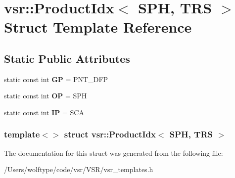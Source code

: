 \hypertarget{structvsr_1_1_product_idx_3_01_s_p_h_00_01_t_r_s_01_4}{\section{vsr\-:\-:Product\-Idx$<$ S\-P\-H, T\-R\-S $>$ Struct Template Reference}
\label{structvsr_1_1_product_idx_3_01_s_p_h_00_01_t_r_s_01_4}
}
\subsection*{Static Public Attributes}
\begin{DoxyCompactItemize}
\item 
\hypertarget{structvsr_1_1_product_idx_3_01_s_p_h_00_01_t_r_s_01_4_a03d2285a868105f6c9f671dab179a107}{static const int {\bfseries G\-P} = P\-N\-T\-\_\-\-D\-F\-P}\label{structvsr_1_1_product_idx_3_01_s_p_h_00_01_t_r_s_01_4_a03d2285a868105f6c9f671dab179a107}

\item 
\hypertarget{structvsr_1_1_product_idx_3_01_s_p_h_00_01_t_r_s_01_4_a7013ed3baad7e838ea842f1cc297808a}{static const int {\bfseries O\-P} = S\-P\-H}\label{structvsr_1_1_product_idx_3_01_s_p_h_00_01_t_r_s_01_4_a7013ed3baad7e838ea842f1cc297808a}

\item 
\hypertarget{structvsr_1_1_product_idx_3_01_s_p_h_00_01_t_r_s_01_4_abdc3cf7481360b21bdbe4b34834a1e1f}{static const int {\bfseries I\-P} = S\-C\-A}\label{structvsr_1_1_product_idx_3_01_s_p_h_00_01_t_r_s_01_4_abdc3cf7481360b21bdbe4b34834a1e1f}

\end{DoxyCompactItemize}
\subsubsection*{template$<$$>$ struct vsr\-::\-Product\-Idx$<$ S\-P\-H, T\-R\-S $>$}



The documentation for this struct was generated from the following file\-:\begin{DoxyCompactItemize}
\item 
/\-Users/wolftype/code/vsr/\-V\-S\-R/vsr\-\_\-templates.\-h\end{DoxyCompactItemize}
